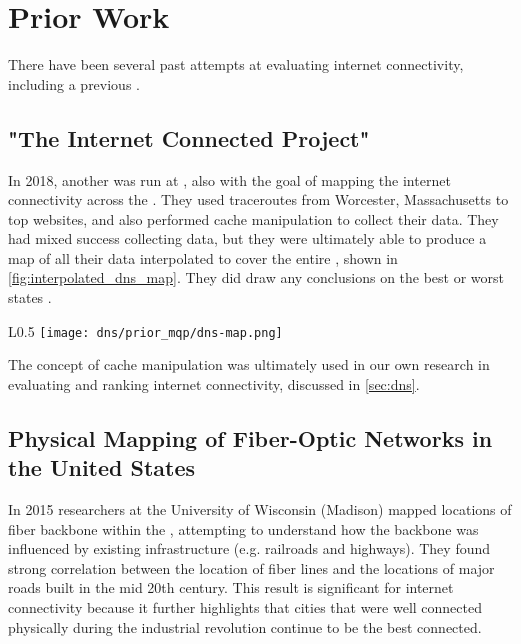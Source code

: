 \section{Prior Work}\label{sec:background_prior_work}

There have been several past attempts at evaluating \us internet connectivity, including a previous \wpi \mqp.

 
\subsection{"The Internet Connected Project"}
In 2018, another \mqp was run at \wpi, also with the goal of mapping the internet connectivity across the \us. They used traceroutes from Worcester, Massachusetts to top websites, and also performed \dns cache manipulation to collect their data. They had mixed success collecting data, but they were ultimately able to produce a map of all their \dns data interpolated to cover the entire \us, shown in \cref{fig:interpolated_dns_map}. They did draw any conclusions on the best or worst states \cite{Fakult2019}.

\begin{wrapfigure}[12]{L}{0.5\textwidth}
    \centering
    \texttt{[image: dns/prior\_mqp/dns-map.png]}
    \caption{Interpolated DNS map from a past MQP\cite{Fakult2019}}
    \label{fig:interpolated_dns_map}
\end{wrapfigure}

The concept of \dns cache manipulation was ultimately used in our own research in evaluating and ranking internet connectivity, discussed in \cref{sec:dns}.

\subsection{Physical Mapping of Fiber-Optic Networks in the United States}
In 2015 researchers at the University of Wisconsin (Madison) mapped locations of fiber backbone within the \us, attempting to understand how the backbone was influenced by existing infrastructure (e.g. railroads and highways). They found strong correlation between the location of fiber lines and the locations of major roads built in the mid 20th century. This result is significant for internet connectivity because it further highlights that cities that were well connected physically during the industrial revolution continue to be the best connected.
 